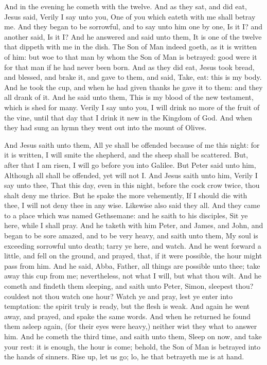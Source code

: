 And in the evening he cometh with the twelve. And as they sat, and did eat, Jesus said, Verily I say unto you, One of you which eateth with me shall betray me. And they began to be sorrowful, and to say unto him one by one, Is it I? and another said, Is it I? And he answered and said unto them, It is one of the twelve that dippeth with me in the dish. The Son of Man indeed goeth, as it is written of him: but woe to that man by whom the Son of Man is betrayed: good were it for that man if he had never been born. And as they did eat, Jesus took bread, and blessed, and brake it, and gave to them, and said, Take, eat: this is my body. And he took the cup, and when he had given thanks he gave it to them: and they all drank of it. And he said unto them, This is my blood of the new testament, which is shed for many. Verily I say unto you, I will drink no more of the fruit of the vine, until that day that I drink it new in the Kingdom of God. And when they had sung an hymn they went out into the mount of Olives.

And Jesus saith unto them, All ye shall be offended because of me this night: for it is written, I will smite the shepherd, and the sheep shall be scattered. But, after that I am risen, I will go before you into Galilee. But Peter said unto him, Although all shall be offended, yet will not I. And Jesus saith unto him, Verily I say unto thee, That this day, even in this night, before the cock crow twice, thou shalt deny me thrice. But he spake the more vehemently, If I should die with thee, I will not deny thee in any wise. Likewise also said they all. And they came to a place which was named Gethsemane: and he saith to his disciples, Sit ye here, while I shall pray. And he taketh with him Peter, and James, and John, and began to be sore amazed, and to be very heavy, and saith unto them, My soul is exceeding sorrowful unto death; tarry ye here, and watch. And he went forward a little, and fell on the ground, and prayed, that, if it were possible, the hour might pass from him. And he said, Abba, Father, all things are possible unto thee; take away this cup from me; nevertheless, not what I will, but what thou wilt. And he cometh and findeth them sleeping, and saith unto Peter, Simon, sleepest thou? couldest not thou watch one hour? Watch ye and pray, lest ye enter into temptation: the spirit truly is ready, but the flesh is weak. And again he went away, and prayed, and spake the same words. And when he returned he found them asleep again, (for their eyes were heavy,) neither wist they what to answer him. And he cometh the third time, and saith unto them, Sleep on now, and take your rest: it is enough, the hour is come; behold, the Son of Man is betrayed into the hands of sinners. Rise up, let us go; lo, he that betrayeth me is at hand.

